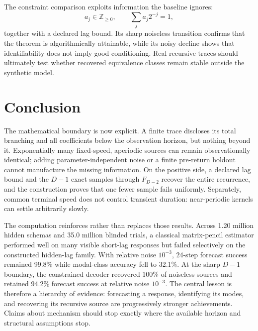 \documentclass[10pt,twocolumn]{article}
\theoremstyle{cleanprop}
\begin{document}
The constraint comparison exploits information the baseline ignores:
\[
a_j\in\mathbb Z_{\ge0},\qquad
\sum_j a_j2^{-j}=1,
\]
together with a declared lag bound. Its sharp noiseless transition confirms
that the theorem is algorithmically attainable, while its noisy decline shows
that identifiability does not imply good conditioning. Real recursive traces
should ultimately test whether recovered equivalence classes remain stable
outside the synthetic model.

\section{Conclusion}

The mathematical boundary is now explicit. A finite trace discloses its total
branching and all coefficients below the observation horizon, but nothing
beyond it. Exponentially many fixed-speed, aperiodic sources
can remain observationally identical; adding parameter-independent noise or a
finite pre-return holdout cannot manufacture the missing information. On the
positive side, a declared lag bound and the $D-1$ exact samples through
$F_{D-2}$ recover the entire recurrence, and the construction proves that one
fewer sample fails uniformly. Separately, common
terminal speed does not control transient duration: near-periodic kernels can
settle arbitrarily slowly.

The computation reinforces rather than replaces those results. Across 1.20
million hidden schemas and 35.0 million blinded trials, a classical
matrix-pencil estimator performed well on many visible short-lag responses but
failed selectively on the constructed hidden-lag family. With relative noise
$10^{-3}$, 24-step forecast success remained 99.8\% while modal-class accuracy
fell to 32.1\%. At the sharp $D-1$ boundary, the constrained decoder recovered
100\% of noiseless sources and retained 94.2\% forecast success at relative
noise $10^{-3}$. The central lesson is therefore a hierarchy of evidence:
forecasting a response, identifying its modes, and recovering its recursive
source are progressively stronger achievements. Claims about mechanism should
stop exactly where the available horizon and structural assumptions stop.
\end{document}
